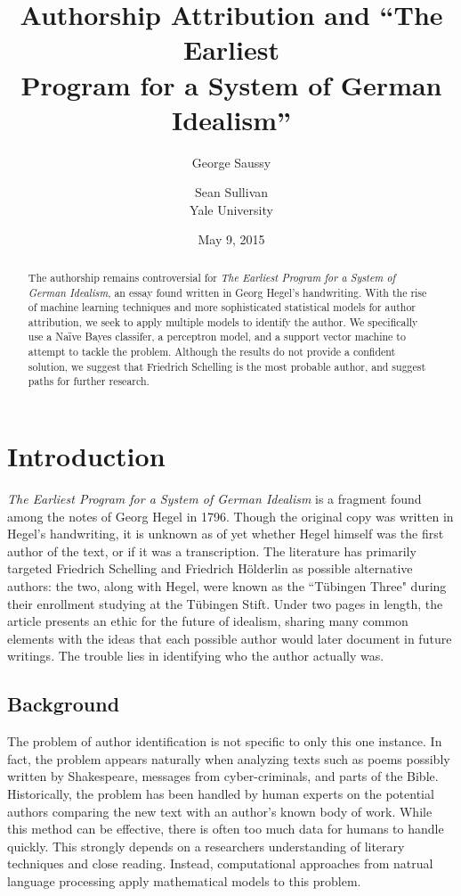 \documentclass[11pt,letterpaper]{article}
\title{Authorship Attribution and ``The Earliest\\ Program for a System of German Idealism''}
\author{George Saussy \and Sean Sullivan \\
         Yale University}
\date{May 9, 2015}
\begin{document}
\maketitle

\begin{abstract}
 The authorship remains controversial for \textit{The Earliest Program for a System of German Idealism}, an essay found written in Georg Hegel's handwriting. With the rise of machine learning techniques and more sophisticated statistical models for author attribution, we seek to apply multiple models to identify the author. We specifically use a Na{\"i}ve Bayes classifer, a perceptron model, and a support vector machine to attempt to tackle the problem. Although the results do not provide a confident solution, we suggest that Friedrich Schelling is the most probable author, and suggest paths for further research.
\end{abstract}

\section{Introduction}
\textit{The Earliest Program for a System of German Idealism} is a fragment found among the notes of Georg Hegel in 1796. Though the original copy was written in Hegel's handwriting, it is unknown as of yet whether Hegel himself was the first author of the text, or if it was a transcription. The literature has primarily targeted Friedrich Schelling and Friedrich H{\"o}lderlin as possible alternative authors: the two, along with Hegel, were known as the ``T{\"u}bingen Three" during their enrollment studying at the T{\"u}bingen Stift. Under two pages in length, the article presents an ethic for the future of idealism, sharing many common elements with the ideas that each possible author would later document in future writings. The trouble lies in identifying who the author actually was.

\subsection{Background}
The problem of author identification is not specific to only this one instance. In fact, the problem appears naturally when analyzing texts such as poems possibly written by Shakespeare, messages from cyber-criminals, and parts of the Bible. Historically, the problem has been handled by human experts on the potential authors comparing the new text with an author's known body of work. While this method can be effective, there is often too much data for humans to handle quickly. This strongly depends on a researchers understanding of literary techniques and close reading. Instead, computational approaches from natrual language processing apply mathematical models to this problem.
\end{document}
